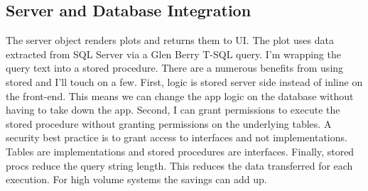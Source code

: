 \documentclass[]{article}
\begin{document}
\hypertarget{server-and-database-integration}{%
\subsection{Server and Database
Integration}\label{server-and-database-integration}}

The server object renders plots and returns them to UI. The plot uses
data extracted from SQL Server via a Glen Berry T-SQL query. I'm
wrapping the query text into a stored procedure. There are a numerous
benefits from using stored and I'll touch on a few. First, logic is
stored server side instead of inline on the front-end. This means we can
change the app logic on the database without having to take down the
app. Second, I can grant permissions to execute the stored procedure
without granting permissions on the underlying tables. A security best
practice is to grant access to interfaces and not implementations.
Tables are implementations and stored procedures are interfaces.
Finally, stored procs reduce the query string length. This reduces the
data transferred for each execution. For high volume systems the savings
can add up.
\end{document}
